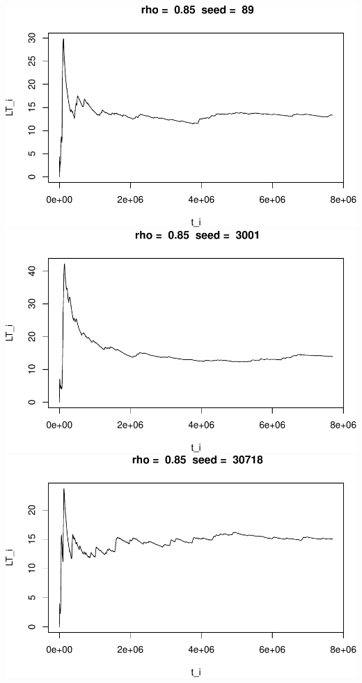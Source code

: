 \documentclass[]{article}
\begin{document}
\includegraphics{003_files/figure-latex/unnamed-chunk-21-7.pdf}
\includegraphics{003_files/figure-latex/unnamed-chunk-21-8.pdf}
\includegraphics{003_files/figure-latex/unnamed-chunk-21-9.pdf}
\end{document}
